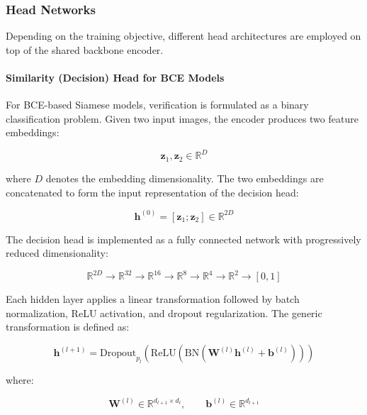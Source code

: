 \subsubsection{Head Networks}

Depending on the training objective, different head architectures are employed on top of the shared backbone encoder.

\paragraph{Similarity (Decision) Head for BCE Models}

For BCE-based Siamese models, verification is formulated as a binary classification problem. Given two input images, the encoder produces two feature embeddings:

\begin{equation}
\mathbf{z}_1,\mathbf{z}_2 \in \mathbb{R}^{D}
\end{equation}

where $D$ denotes the embedding dimensionality. The two embeddings are concatenated to form the input representation of the decision head:

\begin{equation}
\mathbf{h}^{(0)}
=
[\mathbf{z}_1;\mathbf{z}_2]
\in
\mathbb{R}^{2D}
\end{equation}

The decision head is implemented as a fully connected network with progressively reduced dimensionality:

\begin{equation}
\mathbb{R}^{2D}
\rightarrow
\mathbb{R}^{32}
\rightarrow
\mathbb{R}^{16}
\rightarrow
\mathbb{R}^{8}
\rightarrow
\mathbb{R}^{4}
\rightarrow
\mathbb{R}^{2}
\rightarrow
[0,1]
\end{equation}

Each hidden layer applies a linear transformation followed by batch normalization\cite{ioffe2015batchnorm}, ReLU activation, and dropout regularization. The generic transformation is defined as:

\begin{equation}
\mathbf{h}^{(l+1)}
=
\mathrm{Dropout}_{p_l}
\left(
\mathrm{ReLU}
\left(
\mathrm{BN}
\left(
\mathbf{W}^{(l)}\mathbf{h}^{(l)}
+
\mathbf{b}^{(l)}
\right)
\right)
\right)
\end{equation}

where:

\begin{equation}
\mathbf{W}^{(l)}
\in
\mathbb{R}^{d_{l+1}\times d_l},
\qquad
\mathbf{b}^{(l)}
\in
\mathbb{R}^{d_{l+1}}
\end{equation}

